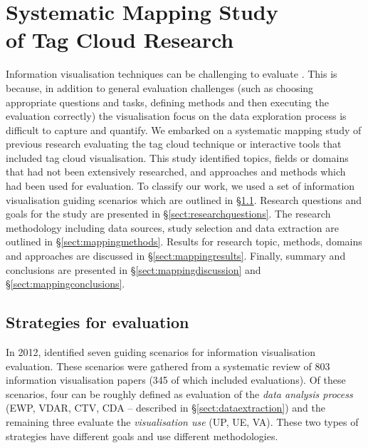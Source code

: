 \chapter[Systematic Mapping Study of Tag Cloud Research]{Systematic Mapping Study\\of Tag Cloud Research}

\label{chap:strateval}
\ifpdf
    \graphicspath{{Chapters/SystematicMappingStudy/SystematicMappingStudyFigs/PNG/}{Chapters/SystematicMappingStudy/SystematicMappingStudyFigs/PDF/}{Chapters/SystematicMappingStudy/SystematicMappingStudyFigs/}}
\else
    \graphicspath{{Chapters/SystematicMappingStudy/SystematicMappingStudyFigs/EPS/}{Chapters/SystematicMappingStudy/SystematicMappingStudyFigs/}}
\fi


Information visualisation techniques can be challenging to evaluate \citep{plaisant04}. This is because, in addition to general evaluation challenges (such as choosing appropriate questions and tasks, defining methods and then executing the evaluation correctly) the visualisation focus on the data exploration process is difficult to capture and quantify. We embarked on a systematic mapping study of previous research evaluating the tag cloud technique or interactive tools that included tag cloud visualisation. This study identified topics, fields or domains that had not been extensively researched, and approaches and methods which had been used for evaluation. To classify our work, we used a set of information visualisation guiding scenarios which are outlined in \S\ref{sect:strategies}. Research questions and goals for the study are presented in \S\ref{sect:researchquestions}. The research methodology including data sources, study selection and data extraction are outlined in \S\ref{sect:mappingmethods}. Results for research topic, methods, domains and approaches are discussed in \S\ref{sect:mappingresults}. Finally, summary and conclusions are presented in  \S\ref{sect:mappingdiscussion} and \S\ref{sect:mappingconclusions}. 


\section{Strategies for evaluation}\label{sect:strategies}

In 2012, \citet{lam12} identified seven guiding scenarios for information visualisation evaluation. These scenarios were gathered from a systematic review of 803 information visualisation papers (345 of which included evaluations). Of these scenarios, four can be roughly defined as evaluation of the \emph{data analysis process} (EWP, VDAR, CTV, CDA -- described in \S\ref{sect:dataextraction}) and the remaining three evaluate the \emph{visualisation use} (UP, UE, VA). These two types of strategies have different goals and use different methodologies. 


